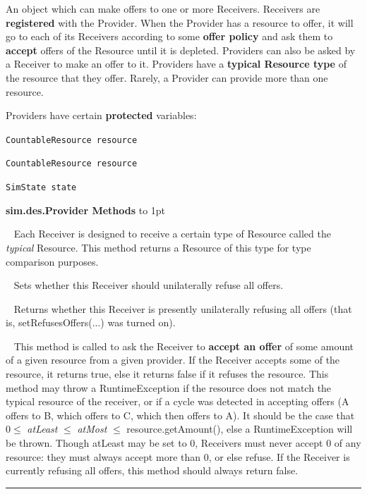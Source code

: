 \documentclass[twoside,10pt]{article}
\newcommand\class[1]{\index{Classes!{#1}}\textsf{#1}}
\newcommand*{\xfill}[1][0pt]{%
	\cleaders
		\hbox to 1pt{\hss
			\raisebox{#1}{\rule{1.2pt}{0.4pt}}%
			\hss}\hfill}
\newenvironment{methods}[1]{
\vspace{1.0em}\noindent\textsf{\textbf{#1 Methods}}\quad \xfill[0.5ex]
\vspace{-0.25em}
\begin{description}
\small}
{\end{description}\hrule\vspace{1.5em}}
\newcommand{\mthd}[1]{\item[{\sf #1}]~\newline}
\begin{document}
An object which can make offers to one or more Receivers.  Receivers are {\bf registered} with the Provider.  When the Provider has a resource to offer, it will go to each of its Receivers according to some {\bf offer policy} and ask them to {\bf accept} offers of the Resource until it is depleted.  Providers can also be asked by a Receiver to make an offer to it.    Providers have a {\bf typical Resource type} of the resource that they offer.  Rarely, a Provider can provide more than one resource.

Providers have certain {\bf protected} variables:

\begin{itemize}
\item {\tt CountableResource resource}\qquad
\item {\tt CountableResource resource}\qquad
\item {\tt SimState state}\qquad

\begin{methods}{\class{sim.des.Provider}}

\mthd{public boolean Resource getTypicalReceived()}
Each Receiver is designed to receive a certain type of Resource called the {\it typical} Resource.  This method returns a Resource of this type for type comparison purposes.

\mthd{public void setRefusesOffers(boolean value)}
Sets whether this Receiver should unilaterally refuse all offers.

\mthd{public boolean getRefusesOffers()}
Returns whether this Receiver is presently unilaterally refusing all offers (that is, setRefusesOffers(...) was turned on).

\mthd{public boolean accept(Provider provider, Resource resource, double atLeast, double atMost)}
This method is called to ask the Receiver to {\bf accept an offer} of some amount of a given resource from a given provider.   If the Receiver accepts some of the resource, it returns true, else it returns false if it refuses the resource.   This method may throw a RuntimeException if the resource does not match the typical resource of the receiver, or if a cycle was detected in accepting offers (A offers to B, which offers to C, which then offers to A).  It should be the case that \(0 \leq\) {\it atLeast} \(\leq\) {\it atMost} \(\leq\) resource.getAmount(), else a RuntimeException will be thrown.  Though atLeast may be set to 0, Receivers must never accept 0 of any resource: they must always accept more than 0, or else refuse.  If the Receiver is currently refusing all offers, this method should always return false.


\end{methods}
\end{itemize}
\end{document}
